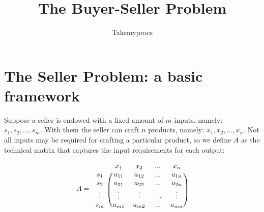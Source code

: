 \documentclass[12pt]{article}         %
\title{The Buyer-Seller Problem}
\author{Takemyprocs}
\begin{document}


\maketitle


\section{The Seller Problem: a basic framework}
Suppose a seller is endowed with a fixed amount of $m$ inputs, namely: $s_1, s_2,...,s_m$. With them the seller can craft $n$ products, namely: $x_1,x_2,...,x_n$. Not all inputs may be required for crafting a particular product, so we define $A$ as the technical matrix that captures the input requirements for each output:

\[
A = 
\begin{blockarray}{ccccc}
& x_1 & x_2 & ... & x_n \\
\begin{block}{c(cccc)}
  s_1 & a_{11} & a_{12} & ...    & a_{1n} \\
  s_2 & a_{21} & a_{22} & ...    & a_{2n} \\
  \vdots & \vdots & \vdots & \ddots & \vdots \\
  s_m & a_{m1} & a_{m2} & ...    & a_{mn} \\
\end{block}
\end{blockarray}
 \]
\end{document}
